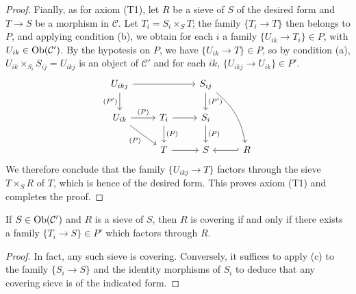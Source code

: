 \begin{proof}
Fianlly, as for axiom (T1), let $R$ be a sieve of $S$ of the desired form and $T\to S$ be a morphism in $\mathcal{C}$. Let $T_i=S_i\times_ST$; the family $\{T_i\to T\}$ then belongs to $P$, and applying condition (b), we obtain for each $i$ a family $\{U_{ik}\to T_i\}\in P$, with $U_{ik}\in\mathrm{Ob}(\mathcal{C}')$. By the hypotesis on $P$, we have $\{U_{ik}\to T\}\in P$, so by condition (a), $U_{ik}\times_{S_i}S_{ij}=U_{ikj}$ is an object of $\mathcal{C}'$ and for each $ik$, $\{U_{ikj}\to U_{ik}\}\in P'$.
\[\begin{tikzcd}
U_{ikj}\ar[d,swap,"(P')"]\ar[rr]&&S_{ij}\ar[rdd,bend left=20pt]\ar[d,"(P')"]&\\
U_{ik}\ar[r,"(P)"]\ar[rd,swap,"(P)"]&T_i\ar[r]\ar[d,"(P)"]&S_i\ar[d,"(P)"]&\\
&T\ar[r]&S&R\ar[l,hook']
\end{tikzcd}\]
We therefore conclude that the family $\{U_{ikj}\to T\}$ factors through the sieve $T\times_SR$ of $T$, which is hence of the desired form. This proves axiom (T1) and completes the proof.
\end{proof}

\begin{corollary}\label{site topology generated by refining family covering sieve iff}
If $S\in\mathrm{Ob}(\mathcal{C}')$ and $R$ is a sieve of $S$, then $R$ is covering if and only if there exists a family $\{T_i\to S\}\in P'$ which factors through $R$.
\end{corollary}
\begin{proof}
In fact, any such sieve is covering. Conversely, it suffices to apply (c) to the family $\{S_i\to S\}$ and the identity morphisms of $S_i$ to deduce that any covering sieve is of the indicated form. 
\end{proof}

